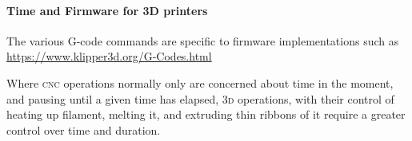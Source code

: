 \documentclass{ltxdoc}
\begin{document}
%
%
%
%
%
%
%
%
%

\paragraph{Time and Firmware for 3D printers}

The various G-code commands are specific to firmware implementations such as \url{https://www.klipper3d.org/G-Codes.html}

Where \textsc{cnc} operations normally only are concerned about time in the moment, and pausing until a given time has elapsed, \textsc{3d} operations, with their control of heating up filament, melting it, and extruding thin ribbons of it require a greater control over time and duration.

%
%
%
%
\end{document}
